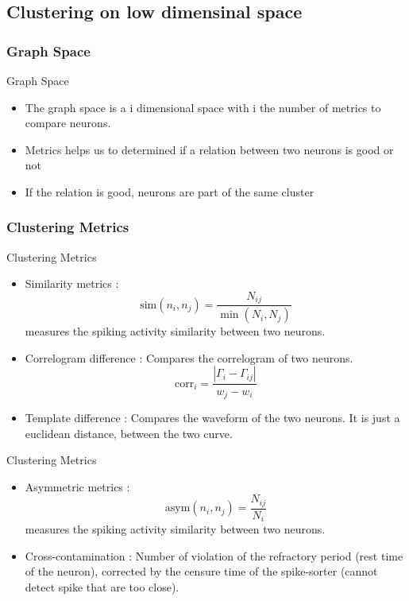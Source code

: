 \documentclass[numbering=fraction]{beamer}
\begin{document}
\subsection{Clustering on low dimensinal space}
\subsubsection{Graph Space}
\begin{frame}{Graph Space}
    \begin{itemize}
        \item The graph space is a i dimensional space with i the number of metrics to compare neurons.
        \item Metrics helps us to determined if a relation between two neurons is good or not
        \item If the relation is good, neurons are part of the same cluster
    \end{itemize}
\end{frame}
\subsubsection{Clustering Metrics}
\begin{frame}{Clustering Metrics}
    \begin{itemize}
        \item Similarity metrics :     $$\text{sim}(n_i, n_j) = \frac{N_{ij}}{\min (N_i, N_j)}$$
              measures the spiking activity similarity between two neurons.
        \item Correlogram difference : Compares the correlogram of two neurons.
              $$\text{corr}_i = \frac{|\Gamma_i - \Gamma_{ij}|}{w_j - w_i}$$
        \item Template difference : Compares the waveform of the two neurons. It is just a euclidean distance, between the two curve.
    \end{itemize}
\end{frame}
\begin{frame}{Clustering Metrics}
    \begin{itemize}
        \item Asymmetric metrics : $$\text{asym}(n_i, n_j) = \frac{N_{ij}}{N_i}$$
              measures the spiking activity similarity between two neurons.
        \item Cross-contamination : Number of violation of the refractory period (rest time of the neuron), corrected by the censure time of the spike-sorter (cannot detect spike that are too close).
    \end{itemize}
\end{frame}
\end{document}
